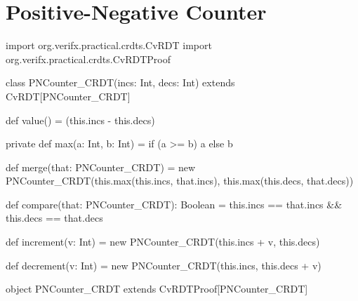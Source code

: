 
%


\chapter{Positive-Negative Counter}
\label{app:positive_negative_counter}

\begin{Scala}
import org.verifx.practical.crdts.CvRDT
import org.verifx.practical.crdts.CvRDTProof

class PNCounter_CRDT(incs: Int, decs: Int) extends CvRDT[PNCounter_CRDT] {

  def value() = {
    (this.incs - this.decs)
  }

  private def max(a: Int, b: Int) = {
    if (a >= b) a else b
  }

  def merge(that: PNCounter_CRDT) = {
    new PNCounter_CRDT(this.max(this.incs, that.incs), this.max(this.decs, that.decs))
  }

  def compare(that: PNCounter_CRDT): Boolean = {
    this.incs == that.incs && this.decs == that.decs
  }

  def increment(v: Int) = {
    new PNCounter_CRDT(this.incs + v, this.decs)
  }

  def decrement(v: Int) = {
    new PNCounter_CRDT(this.incs, this.decs + v)
  }

}

object PNCounter_CRDT extends CvRDTProof[PNCounter_CRDT]
\end{Scala}

